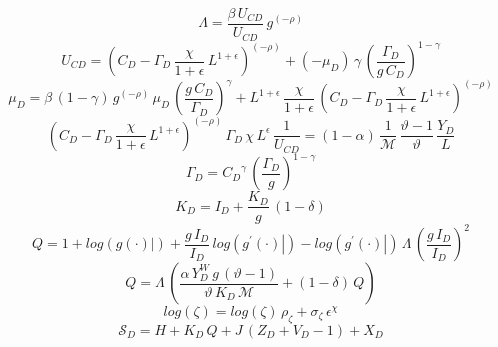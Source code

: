 \documentclass[10pt,a4paper]{article}
\begin{document}
\begin{dmath}
{\Lambda}=\frac{\beta\, {U_{CD}}}{{U_{CD}}}\, {g}^{\left(-\rho\right)}
\end{dmath}
\begin{dmath}
{U_{CD}}=\left({C_D}-{\Gamma_D}\, \frac{\chi}{1+\epsilon}\, {L}^{1+\epsilon}\right)^{\left(-\rho\right)}+\left(-{{\mu}_{D}}\right)\, \gamma\, \left(\frac{{\Gamma_D}}{{g}\, {C_D}}\right)^{1-\gamma}
\end{dmath}
\begin{dmath}
{{\mu}_{D}}=\beta\, \left(1-\gamma\right)\, {g}^{\left(-\rho\right)}\, {{\mu}_{D}}\, \left(\frac{{g}\, {C_D}}{{\Gamma_D}}\right)^{\gamma}+{L}^{1+\epsilon}\, \frac{\chi}{1+\epsilon}\, \left({C_D}-{\Gamma_D}\, \frac{\chi}{1+\epsilon}\, {L}^{1+\epsilon}\right)^{\left(-\rho\right)}
\end{dmath}
\begin{dmath}
\left({C_D}-{\Gamma_D}\, \frac{\chi}{1+\epsilon}\, {L}^{1+\epsilon}\right)^{\left(-\rho\right)}\, {\Gamma_D}\, \chi\, {L}^{\epsilon}\, \frac{1}{{U_{CD}}}=\left(1-\alpha\right)\, \frac{1}{{\mathcal{M}}}\, \frac{\vartheta-1}{\vartheta}\, \frac{{Y_D}}{{L}}
\end{dmath}
\begin{dmath}
{\Gamma_D}={C_D}^{\gamma}\, \left(\frac{{\Gamma_D}}{{g}}\right)^{1-\gamma}
\end{dmath}
\begin{dmath}
{K_D}={I_D}+\frac{{K_D}}{{g}}\, \left(1-\delta\right)
\end{dmath}
\begin{dmath}
{Q}=1+log\left({\left.       g\left( \cdot \right)            \right|}\right)+\frac{{g}\, {I_D}}{{I_D}}\, log\left({\left.       g^{\prime}\left( \cdot \right)   \right|}\right)-log\left({\left.       g^{\prime}\left( \cdot \right)   \right|}\right)\, {\Lambda}\, \left(\frac{{g}\, {I_D}}{{I_D}}\right)^{2}
\end{dmath}
\begin{dmath}
{Q}={\Lambda}\, \left(\frac{\alpha\, {Y^W_D}\, {g}\, \left(\vartheta-1\right)}{\vartheta\, {K_D}\, {\mathcal{M}}}+\left(1-\delta\right)\, {Q}\right)
\end{dmath}
\begin{dmath}
log\left({\zeta}\right)=log\left({\zeta}\right)\, {{\rho}_{\zeta}}+{{\sigma}_{\zeta}}\, {\epsilon}^{\chi}
\end{dmath}
\begin{dmath}
{\mathcal{S}_{D}}={H}+{K_D}\, {Q}+{J}\, \left({Z_D}+{V_D}-1\right)+{X_D}
\end{dmath}
\end{document}
